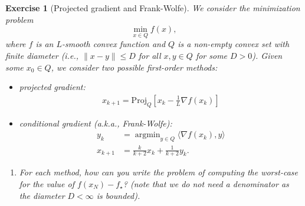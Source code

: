 \documentclass[11pt,a4paper]{article}
\newcommand{\inner}[2]{{\langle #1, #2\rangle}}
\DeclareMathOperator*{\argmin}{argmin}
\newtheorem{exercise}{Exercise}
\begin{document}
	\begin{exercise}[Projected gradient and Frank-Wolfe]\label{ex:FW}
	We consider the minimization problem
	\[ \min_{x\in Q} f(x), \]
	where $f$ is an $L$-smooth convex function and $Q$ is a non-empty convex set with finite diameter (i.e., $\|x-y\|\leqslant D$ for all $x,y\in Q$ for some $D>0$). Given some $x_0\in Q$, we consider two possible first-order methods:
	\begin{itemize}
	\item projected gradient:
	\begin{equation*}
	\begin{aligned}
	x_{k+1}=\mathrm{Proj}_Q\left[x_{k}-\tfrac{1}{L}\nabla f(x_k)\right]
	\end{aligned}
	\end{equation*}
	\item conditional gradient (a.k.a., Frank-Wolfe):
	\begin{equation*}
	\begin{aligned}
	y_k &= \argmin_{y\in Q} \inner{\nabla f(x_k)}{y}\\
	x_{k+1} &= \tfrac{k}{k+2} x_k + \tfrac{1}{k+2} y_k.
	\end{aligned}
	\end{equation*}
	\end{itemize}
	
	\begin{enumerate}
	\item For each method, how can you write the problem of computing the worst-case for the value of $f(x_N)-f_\star$? (note that we do not need a denominator as the diameter $D<\infty$ is bounded).
	

\end{enumerate}
\end{exercise}
\end{document}
